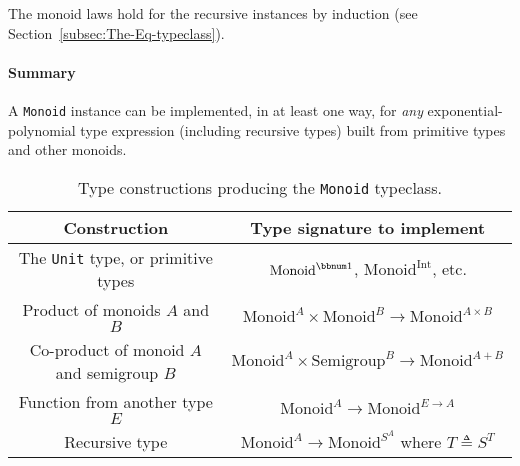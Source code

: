 The monoid laws hold for the recursive instances by induction (see
Section~\ref{subsec:The-Eq-typeclass}).

\paragraph{Summary}

A \lstinline!Monoid! instance can be implemented, in at least one
way, for \emph{any} exponential-polynomial type
expression (including recursive types) built from primitive types
and other monoids.%
\begin{comment}
There exist other type constructions that work for monoids in special
cases. One example is the \textsf{``}twisted product\textsf{''} $P\times Q$ where
$P$ and $Q$ are monoids and additionally $P$ has an \textbf{action
on} $Q$. The \textsf{``}action\textsf{''} is a function $\alpha:P\rightarrow Q\rightarrow Q$
obeying the special composition law, $\alpha(p_{1})\bef\alpha(p_{2})=\alpha(p_{1}\oplus p_{2})$.
The monoidal operation is defined by
\[
(p_{1}\times q_{1})\oplus(p_{2}\times q_{2})=(p_{1}\oplus p_{2})\times(\alpha(p_{2})(q_{1})\oplus q_{2})\quad.
\]
 Examples of this construction are twisted products $\left(A\rightarrow A\right)\times A$
and $\bbnum 2\times\left(\bbnum 1+A\right)$. \textemdash{} Not sure
how useful this is, and what additional properties we need.
\end{comment}

\begin{table}
\begin{centering}
\begin{tabular}{|c|c|}
\hline 
\textbf{\footnotesize{}Construction} & \textbf{\footnotesize{}Type signature to implement}\tabularnewline
\hline 
\hline 
{\footnotesize{}The }\lstinline!Unit!{\footnotesize{} type, or primitive
types} & {\footnotesize{}$\text{Monoid}^{\bbnum 1}$, $\text{Monoid}^{\text{Int}}$,
etc.}\tabularnewline
\hline 
{\footnotesize{}Product of monoids $A$ and $B$} & {\footnotesize{}$\text{Monoid}^{A}\times\text{Monoid}^{B}\rightarrow\text{Monoid}^{A\times B}$}\tabularnewline
\hline 
{\footnotesize{}Co-product of monoid $A$ and semigroup $B$} & {\footnotesize{}$\text{Monoid}^{A}\times\text{Semigroup}^{B}\rightarrow\text{Monoid}^{A+B}$}\tabularnewline
\hline 
{\footnotesize{}Function from another type $E$} & {\footnotesize{}$\text{Monoid}^{A}\rightarrow\text{Monoid}^{E\rightarrow A}$}\tabularnewline
\hline 
{\footnotesize{}Recursive type} & {\footnotesize{}$\text{Monoid}^{A}\rightarrow\text{Monoid}^{S^{A}}$
where $T\triangleq S^{T}$}\tabularnewline
\hline 
\end{tabular}
\par\end{centering}
\caption{Type constructions producing the \lstinline!Monoid! typeclass.\label{tab:Type-constructions-for-monoid}}
\end{table}


